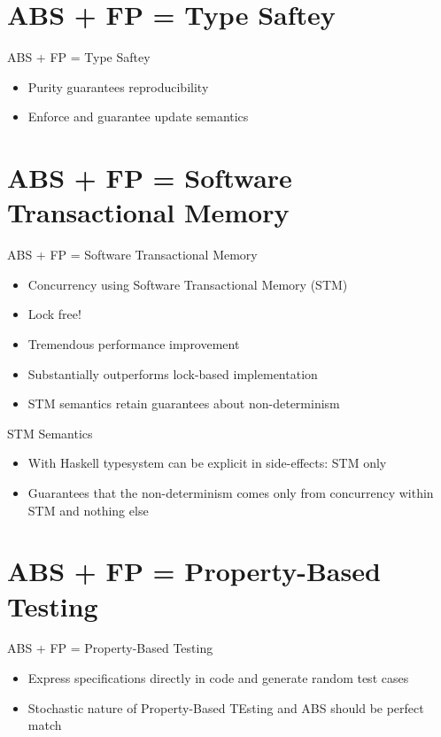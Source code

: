 \documentclass{beamer}
\begin{document}
\section{ABS + FP = Type Saftey}
\begin{frame}{ABS + FP = Type Saftey}
  \begin{itemize}
    \item Purity guarantees reproducibility
    \item Enforce and guarantee update semantics
  \end{itemize}
\end{frame}

\section{ABS + FP = Software Transactional Memory}
\begin{frame}{ABS + FP = Software Transactional Memory}
  \begin{itemize}
    \item Concurrency using Software Transactional Memory (STM)
    \item Lock free!
    \item Tremendous performance improvement
    \item Substantially outperforms lock-based implementation 
    \item STM semantics retain guarantees about non-determinism
  \end{itemize}
\end{frame}

\begin{frame}{STM Semantics}
  \begin{itemize}
    \item With Haskell typesystem can be explicit in side-effects: STM only
    \item Guarantees that the non-determinism comes only from concurrency within STM and nothing else
  \end{itemize}
\end{frame}

\section{ABS + FP = Property-Based Testing}
\begin{frame}{ABS + FP = Property-Based Testing}
  \begin{itemize}
    \item Express specifications directly in code and generate random test cases
    \item Stochastic nature of Property-Based TEsting and ABS should be perfect match
  \end{itemize}
\end{frame}
\end{document}
